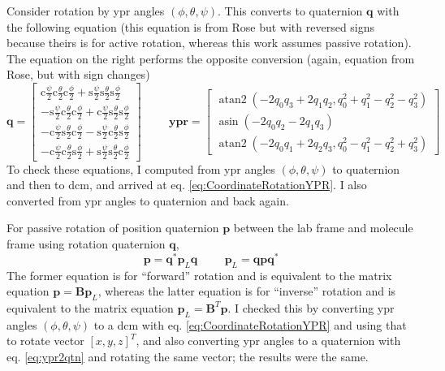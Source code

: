 \documentclass {scrbook}
\DeclareMathOperator{\asin}{asin}
\DeclareMathOperator{\atantwo}{atan2}
\begin{document}
Consider rotation by ypr angles $(\phi,\theta,\psi)$. This converts to quaternion $\bm{q}$ with the following equation (this equation is from Rose but with reversed signs because theirs is for active rotation, whereas this work assumes passive rotation). The equation on the right performs the opposite conversion (again, equation from Rose, but with sign changes)
\begin{equation}
\bm{q} = \left[ \begin{array}{c}
\textrm{c}\frac{\psi}{2} \textrm{c}\frac{\theta}{2} \textrm{c}\frac{\phi}{2} +
\textrm{s}\frac{\psi}{2} \textrm{s}\frac{\theta}{2} \textrm{s}\frac{\phi}{2} \\
-\textrm{s}\frac{\psi}{2} \textrm{c}\frac{\theta}{2} \textrm{c}\frac{\phi}{2} +
\textrm{c}\frac{\psi}{2} \textrm{s}\frac{\theta}{2} \textrm{s}\frac{\phi}{2} \\
-\textrm{c}\frac{\psi}{2} \textrm{s}\frac{\theta}{2} \textrm{c}\frac{\phi}{2} -
\textrm{s}\frac{\psi}{2} \textrm{c}\frac{\theta}{2} \textrm{s}\frac{\phi}{2} \\
-\textrm{c}\frac{\psi}{2} \textrm{c}\frac{\theta}{2} \textrm{s}\frac{\phi}{2} +
\textrm{s}\frac{\psi}{2} \textrm{s}\frac{\theta}{2} \textrm{c}\frac{\phi}{2}
\end{array} \right]
\hspace{1cm}
\bm{ypr}=\left[\begin{array}{c}
\atantwo(-2q_0q_3+2q_1q_2,q_0^2+q_1^2-q_2^2-q_3^2) \\
\asin(-2q_0q_2-2q_1q_3) \\
\atantwo(-2q_0q_1+2q_2q_3,q_0^2-q_1^2-q_2^2+q_3^2)
\end{array} \right]
\label{eq:ypr2qtn}
\end{equation}
To check these equations, I computed from ypr angles $(\phi,\theta,\psi)$ to quaternion and then to dcm, and arrived at eq. \ref{eq:CoordinateRotationYPR}. I also converted from ypr angles to quaternion and back again.

For passive rotation of position quaternion $\bm{p}$ between the lab frame and molecule frame using rotation quaternion $\bm{q}$,
$$\bm{p} = \bm{q}^* \bm{p}_L \bm{q} \hspace{1cm}
\bm{p}_L = \bm{q} \bm{p} \bm{q}^*$$
The former equation is for ``forward'' rotation and is equivalent to the matrix equation $\bm{p}=\bm{B}\bm{p}_L$, whereas the latter equation is for ``inverse'' rotation and is equivalent to the matrix equation $\bm{p}_L=\bm{B}^T\bm{p}$. I checked this by converting ypr angles $(\phi,\theta,\psi)$ to a dcm with eq. \ref{eq:CoordinateRotationYPR} and using that to rotate vector $[x,y,z]^T$, and also converting ypr angles to a quaternion with eq. \ref{eq:ypr2qtn} and rotating the same vector; the results were the same.
\end{document}
